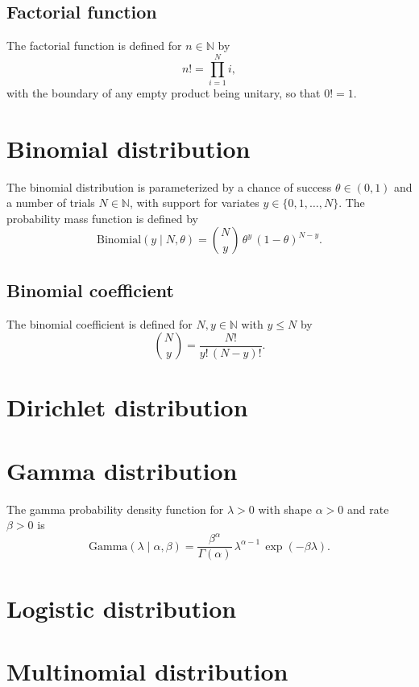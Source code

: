 \documentclass[11pt]{report}
\begin{document}
\subsection{Factorial function}

The factorial function is defined for $n \in \mathbb{N}$ by
\[
  n! = \prod_{i = 1}^N i,
\]
with the boundary of any empty product being unitary, so that $0! =
1$.

\section{Binomial distribution}

The binomial distribution is parameterized by a chance of success
$\theta \in (0, 1)$ and a number of trials $N \in \mathbb{N}$, with
support for variates $y \in \{0, 1, \ldots, N\}$.  The probability mass
function is defined by
\[
  \textrm{Binomial}(y \mid N, \theta)
  = \binom{N}{y} \, \theta^y \, (1 - \theta)^{N - y}.
\]

\subsection{Binomial coefficient}

The binomial coefficient is defined for $N, y \in \mathbb{N}$ with $y
\leq N$ by
\[
  \binom{N}{y} = \frac{N!}{y! \, (N - y)!}.
\]

\section{Dirichlet distribution}

\section{Gamma distribution}

The gamma probability density function for $\lambda > 0$
with shape $\alpha > 0$ and rate $\beta > 0$ is
\[
  \textrm{Gamma}(\lambda \mid \alpha, \beta)
  = \frac{\beta^{\alpha}}{\Gamma(\alpha)}
  \, \lambda^{\alpha - 1}
  \, \exp(-\beta \lambda).
\]


\section{Logistic distribution}

\section{Multinomial distribution}
\end{document}
